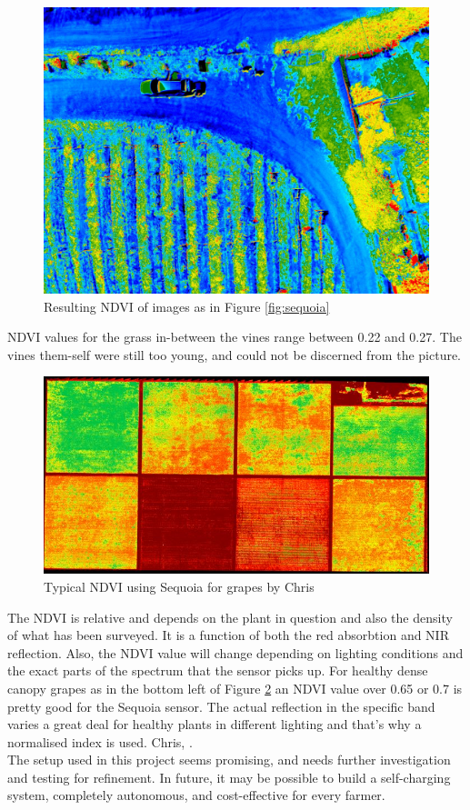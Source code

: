 \begin{figure}[H]
\centering
\includegraphics[scale=0.11]{images/sequoia_ndvi.jpg}
\caption{Resulting NDVI of images as in Figure \ref{fig:sequoia}}
\label{fig:sequoia_ndvi}
\end{figure}

NDVI values for the grass in-between the vines range between 0.22 and 0.27. The vines them-self were still too young, and could not be discerned from the picture.

\begin{figure}[H]
\centering
\includegraphics[scale=0.3]{images/chris_example_ndvi.JPG}
\caption{Typical NDVI using Sequoia for grapes by Chris}
\label{fig:chris_ndvi}
\end{figure}

The NDVI is relative and depends on the plant in question and also the density of what has been surveyed. It is a function of both the red absorbtion and NIR reflection. Also, the NDVI value will change depending on lighting conditions and the exact parts of the spectrum that the sensor picks up. For healthy dense canopy grapes as in the bottom left of Figure \ref{fig:chris_ndvi} an NDVI value over 0.65 or 0.7 is pretty good for the Sequoia sensor. The actual reflection in the specific band varies a great deal for healthy plants in different lighting and that’s why a normalised index is used. Chris, \cite{chris}.\\

The setup used in this project seems promising, and needs further investigation and testing for refinement. In future, it may be possible to build a self-charging system, completely autonomous, and cost-effective for every farmer.